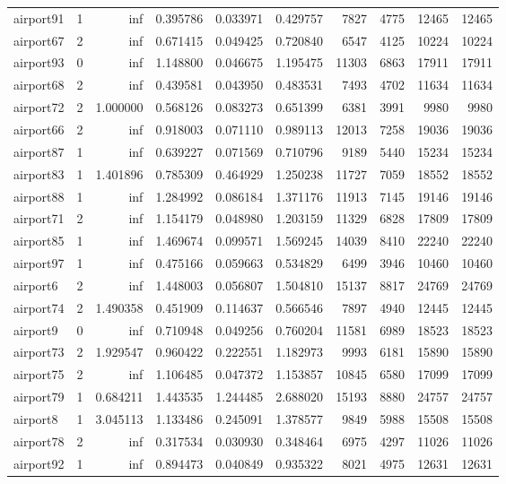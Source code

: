 \begin{longtable}{|l|r|r|r|r|r|r|r|r|r|}
airport91 & 1 & inf & 0.395786 & 0.033971 & 0.429757 & 7827 & 4775 & 12465 & 12465 \\
airport67 & 2 & inf & 0.671415 & 0.049425 & 0.720840 & 6547 & 4125 & 10224 & 10224 \\
airport93 & 0 & inf & 1.148800 & 0.046675 & 1.195475 & 11303 & 6863 & 17911 & 17911 \\
airport68 & 2 & inf & 0.439581 & 0.043950 & 0.483531 & 7493 & 4702 & 11634 & 11634 \\
airport72 & 2 & 1.000000 & 0.568126 & 0.083273 & 0.651399 & 6381 & 3991 & 9980 & 9980 \\
airport66 & 2 & inf & 0.918003 & 0.071110 & 0.989113 & 12013 & 7258 & 19036 & 19036 \\
airport87 & 1 & inf & 0.639227 & 0.071569 & 0.710796 & 9189 & 5440 & 15234 & 15234 \\
airport83 & 1 & 1.401896 & 0.785309 & 0.464929 & 1.250238 & 11727 & 7059 & 18552 & 18552 \\
airport88 & 1 & inf & 1.284992 & 0.086184 & 1.371176 & 11913 & 7145 & 19146 & 19146 \\
airport71 & 2 & inf & 1.154179 & 0.048980 & 1.203159 & 11329 & 6828 & 17809 & 17809 \\
airport85 & 1 & inf & 1.469674 & 0.099571 & 1.569245 & 14039 & 8410 & 22240 & 22240 \\
airport97 & 1 & inf & 0.475166 & 0.059663 & 0.534829 & 6499 & 3946 & 10460 & 10460 \\
airport6 & 2 & inf & 1.448003 & 0.056807 & 1.504810 & 15137 & 8817 & 24769 & 24769 \\
airport74 & 2 & 1.490358 & 0.451909 & 0.114637 & 0.566546 & 7897 & 4940 & 12445 & 12445 \\
airport9 & 0 & inf & 0.710948 & 0.049256 & 0.760204 & 11581 & 6989 & 18523 & 18523 \\
airport73 & 2 & 1.929547 & 0.960422 & 0.222551 & 1.182973 & 9993 & 6181 & 15890 & 15890 \\
airport75 & 2 & inf & 1.106485 & 0.047372 & 1.153857 & 10845 & 6580 & 17099 & 17099 \\
airport79 & 1 & 0.684211 & 1.443535 & 1.244485 & 2.688020 & 15193 & 8880 & 24757 & 24757 \\
airport8 & 1 & 3.045113 & 1.133486 & 0.245091 & 1.378577 & 9849 & 5988 & 15508 & 15508 \\
airport78 & 2 & inf & 0.317534 & 0.030930 & 0.348464 & 6975 & 4297 & 11026 & 11026 \\
airport92 & 1 & inf & 0.894473 & 0.040849 & 0.935322 & 8021 & 4975 & 12631 & 12631 \\

\end{longtable}
